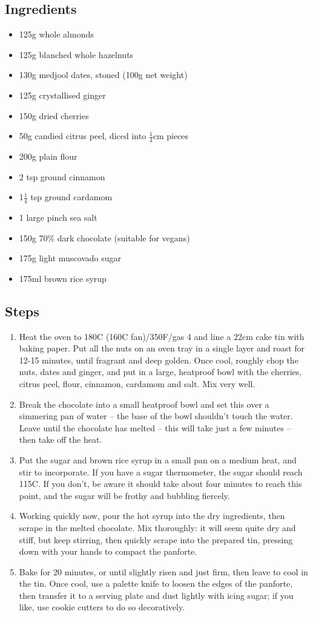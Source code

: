 \documentclass{book}
\begin{document}
\subsection*{Ingredients}
\begin{itemize}
\item 125g whole almonds
\item 125g blanched whole hazelnuts 
\item 130g medjool dates, stoned (100g net weight) 
\item 125g crystallised ginger 
\item 150g dried cherries
\item 50g candied citrus peel, diced into $\frac{1}{4}$cm pieces 
\item 200g plain flour 
\item 2 tsp ground cinnamon 
\item 1$\frac{1}{4}$ tsp ground cardamom 
\item 1 large pinch sea salt 
\item 150g 70\% dark chocolate (suitable for vegans) 
\item 175g light muscovado sugar 
\item 175ml brown rice syrup
\end{itemize}

\subsection*{Steps}
\begin{enumerate}
\item Heat the oven to 180C (160C fan)/350F/gas 4 and line a 22cm cake tin with baking paper. Put all the nuts on an oven tray in a single layer and roast for 12-15 minutes, until fragrant and deep golden. Once cool, roughly chop the nuts, dates and ginger, and put in a large, heatproof bowl with the cherries, citrus peel, flour, cinnamon, cardamom and salt. Mix very well.
\item Break the chocolate into a small heatproof bowl and set this over a simmering pan of water – the base of the bowl shouldn’t touch the water. Leave until the chocolate has melted – this will take just a few minutes – then take off the heat.
\item Put the sugar and brown rice syrup in a small pan on a medium heat, and stir to incorporate. If you have a sugar thermometer, the sugar should reach 115C. If you don’t, be aware it should take about four minutes to reach this point, and the sugar will be frothy and bubbling fiercely.
\item Working quickly now, pour the hot syrup into the dry ingredients, then scrape in the melted chocolate. Mix thoroughly: it will seem quite dry and stiff, but keep stirring, then quickly scrape into the prepared tin, pressing down with your hands to compact the panforte.
\item Bake for 20 minutes, or until slightly risen and just firm, then leave to cool in the tin. Once cool, use a palette knife to loosen the edges of the panforte, then transfer it to a serving plate and dust lightly with icing sugar; if you like, use cookie cutters to do so decoratively.
\end{enumerate}
\newpage
\end{document}
